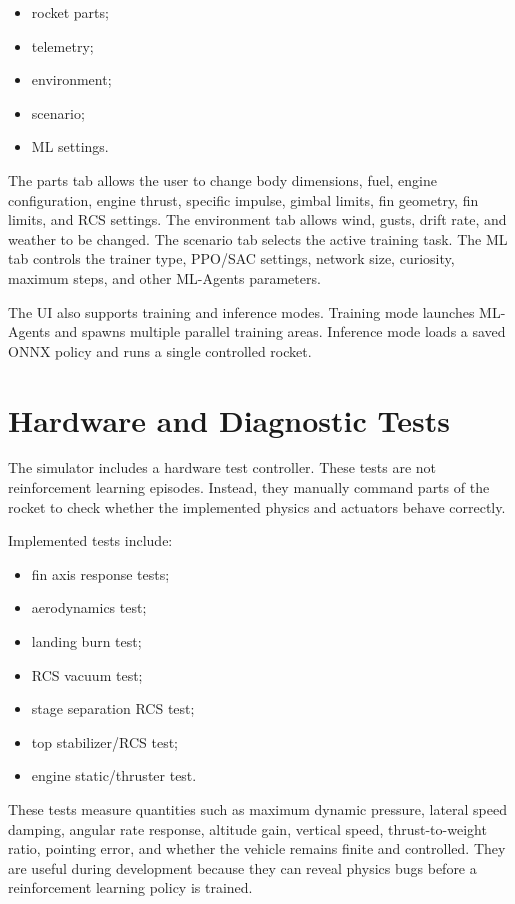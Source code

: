 \documentclass[12pt,a4paper]{article}
\begin{document}
\begin{itemize}
    \item rocket parts;
    \item telemetry;
    \item environment;
    \item scenario;
    \item ML settings.
\end{itemize}

The parts tab allows the user to change body dimensions, fuel, engine configuration, engine thrust, specific impulse, gimbal limits, fin geometry, fin limits, and RCS settings. The environment tab allows wind, gusts, drift rate, and weather to be changed. The scenario tab selects the active training task. The ML tab controls the trainer type, PPO/SAC settings, network size, curiosity, maximum steps, and other ML-Agents parameters.

The UI also supports training and inference modes. Training mode launches ML-Agents and spawns multiple parallel training areas. Inference mode loads a saved ONNX policy and runs a single controlled rocket.

\section{Hardware and Diagnostic Tests}

The simulator includes a hardware test controller. These tests are not reinforcement learning episodes. Instead, they manually command parts of the rocket to check whether the implemented physics and actuators behave correctly.

Implemented tests include:

\begin{itemize}
    \item fin axis response tests;
    \item aerodynamics test;
    \item landing burn test;
    \item RCS vacuum test;
    \item stage separation RCS test;
    \item top stabilizer/RCS test;
    \item engine static/thruster test.
\end{itemize}

These tests measure quantities such as maximum dynamic pressure, lateral speed damping, angular rate response, altitude gain, vertical speed, thrust-to-weight ratio, pointing error, and whether the vehicle remains finite and controlled. They are useful during development because they can reveal physics bugs before a reinforcement learning policy is trained.
\end{document}
